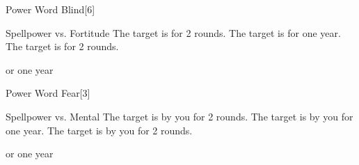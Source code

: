 \begin{spellsection}{Power Word Blind}[6]
    \begin{spellheader}
    \end{spellheader}
    \begin{spellcontent}
        \begin{spelltargetinginfo}
        \end{spelltargetinginfo}
        \begin{spelleffects}
            \begin{spellattack}{Spellpower vs. Fortitude}
                \spellsuccess The target is \blinded for 2 rounds.
                \spellcritical The target is \blinded for one year.
                \spellfailure The target is \partiallyblinded for 2 rounds.
            \end{spellattack}
            \spelldur \durbrief or one year
        \end{spelleffects}
    \end{spellcontent}
    \begin{spellfooter}
        \miscastrandom
    \end{spellfooter}
\end{spellsection}

\begin{spellsection}{Power Word Fear}[3]
    \begin{spellheader}
    \end{spellheader}
    \begin{spellcontent}
        \begin{spelltargetinginfo}
        \end{spelltargetinginfo}
        \begin{spelleffects}
            \begin{spellattack}{Spellpower vs. Mental}
                \spellsuccess The target is \frightened by you for 2 rounds.
                \spellcritical The target is \frightened by you for one year.
                \spellfailure The target is \shaken by you for 2 rounds.
            \end{spellattack}
            \spelldur \durbrief or one year
        \end{spelleffects}
    \end{spellcontent}
    \begin{spellfooter}
        \miscastrandom
    \end{spellfooter}
\end{spellsection}

